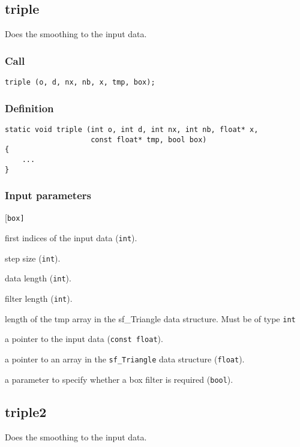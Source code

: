 \subsection{{triple}}\label{sec:triple}
Does the smoothing to the input data.

\subsubsection*{Call}
\begin{verbatim}triple (o, d, nx, nb, x, tmp, box);\end{verbatim}

\subsubsection*{Definition}
\begin{verbatim}
static void triple (int o, int d, int nx, int nb, float* x, 
                    const float* tmp, bool box)
{
    ...
}
\end{verbatim}

\subsubsection*{Input parameters}
\begin{desclist}{\tt }{\quad}[\tt box]
   \setlength\itemsep{0pt}
   \item[o]   first indices of the input data (\texttt{int}).  
   \item[d]   step size (\texttt{int}).
   \item[nx]	  data length (\texttt{int}).        
   \item[nb]  filter length (\texttt{int}).        
   \item[np]	  length of the tmp array in the {sf\_Triangle} data structure. Must be of type \texttt{int}
   \item[x]   a pointer to the input data (\texttt{const float}). 
   \item[tmp] a pointer to an array in the \texttt{sf\_Triangle} data structure (\texttt{float}).
   \item[box] a parameter to specify whether a box filter is required (\texttt{bool}).
\end{desclist}




\subsection{{triple2}}\label{sec:triple2}
Does the smoothing to the input data.

